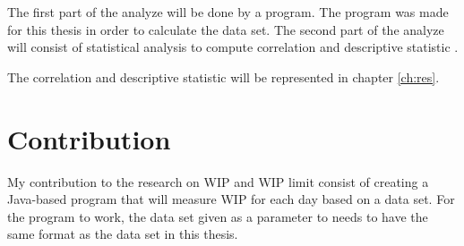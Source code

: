 \documentclass[UKenglish]{ifimaster}  %
\begin{document}
The first part of the analyze will be done by a program. The program was made for this thesis in order to calculate the data set. The second part of the analyze will consist of statistical analysis to compute correlation and descriptive statistic .

The correlation and  descriptive statistic will be represented in chapter \ref{ch:res}. 
\section{Contribution}
My contribution to the research on WIP and WIP limit consist of creating a Java-based program that will measure WIP for each day based on a data set. For the program to work, the data set given as a parameter to needs to have the same format as the data set in this thesis. 
\end{document}
